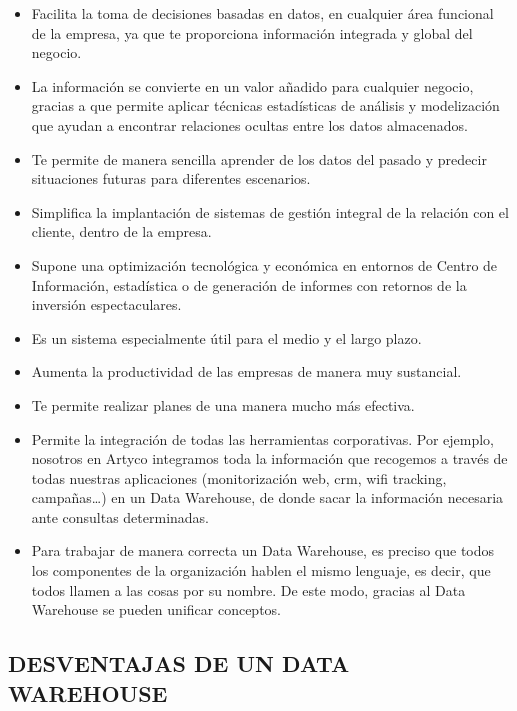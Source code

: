 \documentclass[preprint,12pt]{elsarticle}
\begin{document}
\begin{itemize}

\item Facilita la toma de decisiones basadas en datos, en cualquier área funcional de la empresa, ya que te proporciona información integrada y global del negocio.
\item La información se convierte en un valor añadido para cualquier negocio, gracias a que permite aplicar técnicas estadísticas de análisis y modelización que ayudan a encontrar relaciones ocultas entre los datos almacenados.
\item Te permite de manera sencilla aprender de los datos del pasado y predecir situaciones futuras para diferentes escenarios.
\item Simplifica la implantación de sistemas de gestión integral de la relación con el cliente, dentro de la empresa.
\item Supone una optimización tecnológica y económica en entornos de Centro de Información, estadística o de generación de informes con retornos de la inversión espectaculares.
\item Es un sistema especialmente útil para el medio y el largo plazo.
\item Aumenta la productividad de las empresas de manera muy sustancial.
\item Te permite realizar planes de una manera mucho más efectiva.
\item Permite la integración de todas las herramientas corporativas. Por ejemplo, nosotros en Artyco integramos toda la información que recogemos a través de todas nuestras aplicaciones (monitorización web, crm, wifi tracking, campañas…) en un Data Warehouse, de donde sacar la información necesaria ante consultas determinadas.
\item Para trabajar de manera correcta un Data Warehouse, es preciso que todos los componentes de la organización hablen el mismo lenguaje, es decir, que todos llamen a las cosas por su nombre. De este modo, gracias al Data Warehouse se pueden unificar conceptos.

\end{itemize}

\subsection{DESVENTAJAS DE UN DATA WAREHOUSE}	
\end{document}

